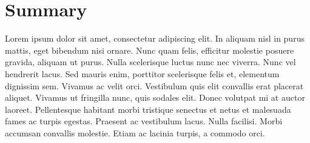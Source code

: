 \section{Summary}\label{sec:4.4}
\vspace{-0.5cm}
\noindent Lorem ipsum dolor sit amet, consectetur adipiscing elit. In aliquam nisl in purus mattis, eget bibendum nisi ornare. Nunc quam felis, efficitur molestie posuere gravida, aliquam ut purus. Nulla scelerisque luctus nunc nec viverra. Nunc vel hendrerit lacus. Sed mauris enim, porttitor scelerisque felis et, elementum dignissim sem. Vivamus ac velit orci. Vestibulum quis elit convallis erat placerat aliquet. Vivamus ut fringilla nunc, quis sodales elit. Donec volutpat mi at auctor laoreet. Pellentesque habitant morbi tristique senectus et netus et malesuada fames ac turpis egestas. Praesent ac vestibulum lacus. Nulla facilisi. Morbi accumsan convallis molestie. Etiam ac lacinia turpis, a commodo orci.

\vspace{-0.3cm}



